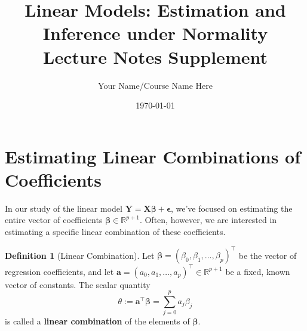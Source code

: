 \documentclass[11pt, letterpaper]{article}
\theoremstyle{plain} %
\theoremstyle{definition} %
\newtheorem{definition}[theorem]{Definition}
\theoremstyle{remark} %
\newcommand{\R}{\mathbb{R}}
\newenvironment{announcement}
  {\begin{center}\normalfont\bfseries --- Course Announcements ---\end{center}\begin{itemize}}
  {\end{itemize}\hrulefill\vspace{1em}}
\begin{document}
\title{Linear Models: Estimation and Inference under Normality \\ \Large Lecture Notes Supplement}
\author{Your Name/Course Name Here} %
\date{\today} %
\maketitle



\section{Estimating Linear Combinations of Coefficients}

In our study of the linear model $\boldsymbol{Y} = \boldsymbol{X}\boldsymbol{\beta} + \boldsymbol{\epsilon}$, we've focused on estimating the entire vector of coefficients $\boldsymbol{\beta} \in \R^{p+1}$. Often, however, we are interested in estimating a specific linear combination of these coefficients.

\begin{definition}[Linear Combination]
Let $\boldsymbol{\beta} = (\beta_0, \beta_1, \ldots, \beta_p)^{\top}$ be the vector of regression coefficients, and let $\boldsymbol{a} = (a_0, a_1, \ldots, a_p)^{\top} \in \R^{p+1}$ be a fixed, known vector of constants. The scalar quantity
\begin{equation}
\theta := \boldsymbol{a}^{\top} \boldsymbol{\beta} = \sum_{j=0}^{p} a_j \beta_j
\end{equation}
is called a \textbf{linear combination} of the elements of $\boldsymbol{\beta}$.
\end{definition}
\end{document}
